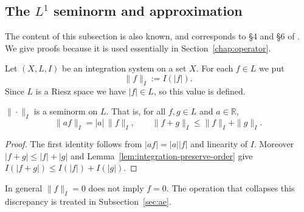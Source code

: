 \subsection{The $L^1$ seminorm and approximation}

The content of this subsection is also known, and corresponds to \S4 and \S6 of
\cite{BM}.
We give proofs because it is used essentially in
Section~\ref{chap:operator}.

\begin{definition}\label{def:l1-seminorm}
  Let $(X,L,I)$ be an integration system on a set $X$.
  For each $f\in L$ we put
  \[
    \|f\|_I:=I(|f|) .
  \]
  Since $L$ is a Riesz space we have $|f|\in L$, so this value is defined.
\end{definition}

\begin{lemma}\label{lem:l1-seminorm}
  $\|\cdot\|_I$ is a seminorm on $L$. That is, for all $f,g\in L$ and
  $a\in\mathbb{R}$,
  \[
    \|af\|_I=|a|\,\|f\|_I,
    \qquad
    \|f+g\|_I\le\|f\|_I+\|g\|_I.
  \]
\end{lemma}
\begin{proof}
  The first identity follows from $|af|=|a||f|$ and linearity of $I$.
  Moreover $|f+g|\le|f|+|g|$ and
  Lemma~\ref{lem:integration-preserve-order} give
  $I(|f+g|)\le I(|f|)+I(|g|)$.
\end{proof}

\begin{remark}
  In general $\|f\|_I=0$ does not imply $f=0$.
  The operation that collapses this discrepancy is treated in
  Subsection~\ref{sec:ae}.
\end{remark}

